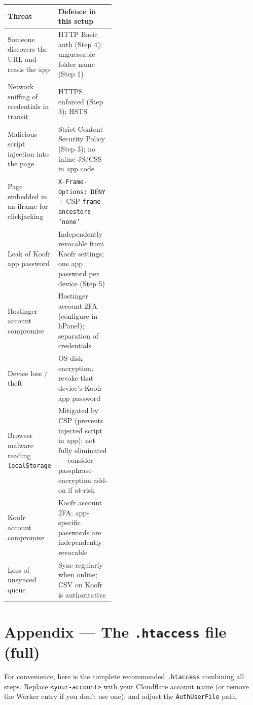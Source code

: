 \documentclass[11pt,a4paper]{article}
\begin{document}
\begin{center}
\small
\renewcommand{\arraystretch}{1.35}
\begin{tabularx}{\linewidth}{>{\raggedright\arraybackslash}p{0.42\linewidth} X}
\textbf{Threat} & \textbf{Defence in this setup} \\ \hline
Someone discovers the URL and reads the app & HTTP Basic auth (Step 4); unguessable folder name (Step 1) \\
Network sniffing of credentials in transit & HTTPS enforced (Step 3); HSTS \\
Malicious script injection into the page & Strict Content Security Policy (Step 3); no inline JS/CSS in app code \\
Page embedded in an iframe for clickjacking & \texttt{X-Frame-Options: DENY} + CSP \texttt{frame-ancestors 'none'} \\
Leak of Koofr app password & Independently revocable from Koofr settings; one app password per device (Step 5) \\
Hostinger account compromise & Hostinger account 2FA (configure in hPanel); separation of credentials \\
Device loss / theft & OS disk encryption; revoke that device's Koofr app password \\
Browser malware reading \texttt{localStorage} & Mitigated by CSP (prevents injected script in app); not fully eliminated --- consider passphrase-encryption add-on if at-risk \\
Koofr account compromise & Koofr account 2FA; app-specific passwords are independently revocable \\
Loss of unsynced queue & Sync regularly when online; CSV on Koofr is authoritative \\
\end{tabularx}
\end{center}

\section*{Appendix --- The \texttt{.htaccess} file (full)}

For convenience, here is the complete recommended \texttt{.htaccess} combining all steps. Replace \texttt{<your-account>} with your Cloudflare account name (or remove the Worker entry if you don't use one), and adjust the \texttt{AuthUserFile} path.
\end{document}
